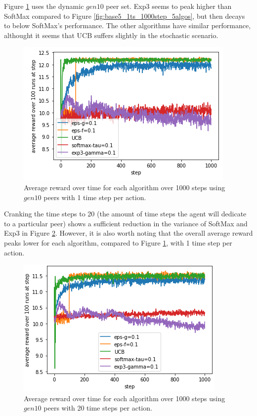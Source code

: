 \documentclass{article}
\begin{document}
Figure \ref{fig:gen10_1ts_1000step_5algos} uses the dynamic $gen10$ peer set. Exp3 seems to peak higher than SoftMax compared to Figure \ref{fig:base5_1ts_1000step_5algos}, 
but then decays to below SoftMax's performance. The other algorithms have similar performance, althought it seems that UCB suffers slightly in the stochastic scenario. 
\begin{figure}[h]
    \centering
    \includegraphics[width=1\linewidth]{figs/gen10_1ts_1000step_5algos.png}
    \caption{Average reward over time for each algorithm over 1000 steps using $gen10$ peers with 1 time step per action.}
    \label{fig:gen10_1ts_1000step_5algos}
\end{figure}

Cranking the time steps to 20 (the amount of time steps the agent will dedicate to a particular peer) shows a sufficient reduction in the variance of SoftMax and Exp3 in 
Figure \ref{fig:gen10_20ts_1000step_5algos}. However, it is also worth noting that the overall average reward peaks lower for each algorithm, compared to 
Figure \ref{fig:gen10_1ts_1000step_5algos}, with 1 time step per action.
\begin{figure}[h]
    \centering
    \includegraphics[width=1\linewidth]{figs/gen10_20ts_1000step_5algos.png}
    \caption{Average reward over time for each algorithm over 1000 steps using $gen10$ peers with 20 time steps per action.}
    \label{fig:gen10_20ts_1000step_5algos}
\end{figure}
\end{document}

